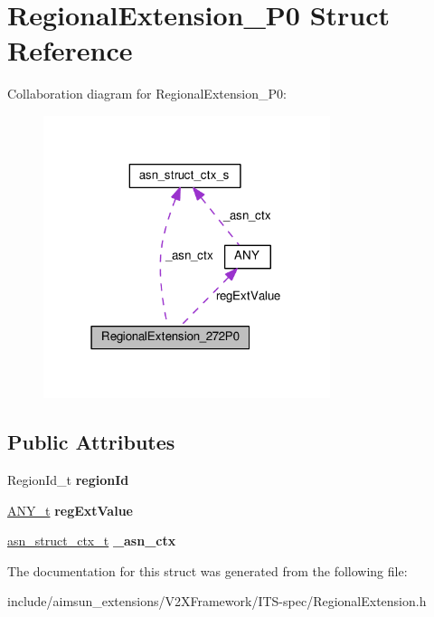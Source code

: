 \hypertarget{structRegionalExtension__272P0}{}\section{Regional\+Extension\+\_\+P0 Struct Reference}
\label{structRegionalExtension__272P0}


Collaboration diagram for Regional\+Extension\+\_\+P0\+:\nopagebreak
\begin{figure}[H]
\begin{center}
\leavevmode
\includegraphics[width=238pt]{structRegionalExtension__272P0__coll__graph}
\end{center}
\end{figure}
\subsection*{Public Attributes}
\begin{DoxyCompactItemize}
\item 
Region\+Id\+\_\+t {\bfseries region\+Id}\hypertarget{structRegionalExtension__272P0_adbb3ddfbe55ee7871ee7545842c50400}{}\label{structRegionalExtension__272P0_adbb3ddfbe55ee7871ee7545842c50400}

\item 
\hyperlink{structANY}{A\+N\+Y\+\_\+t} {\bfseries reg\+Ext\+Value}\hypertarget{structRegionalExtension__272P0_a28a6f18a8741fbc99d52ad4d54604769}{}\label{structRegionalExtension__272P0_a28a6f18a8741fbc99d52ad4d54604769}

\item 
\hyperlink{structasn__struct__ctx__s}{asn\+\_\+struct\+\_\+ctx\+\_\+t} {\bfseries \+\_\+asn\+\_\+ctx}\hypertarget{structRegionalExtension__272P0_a68ca643d5711946f30f35dc8a6fe6f6a}{}\label{structRegionalExtension__272P0_a68ca643d5711946f30f35dc8a6fe6f6a}

\end{DoxyCompactItemize}


The documentation for this struct was generated from the following file\+:\begin{DoxyCompactItemize}
\item 
include/aimsun\+\_\+extensions/\+V2\+X\+Framework/\+I\+T\+S-\/spec/Regional\+Extension.\+h\end{DoxyCompactItemize}
